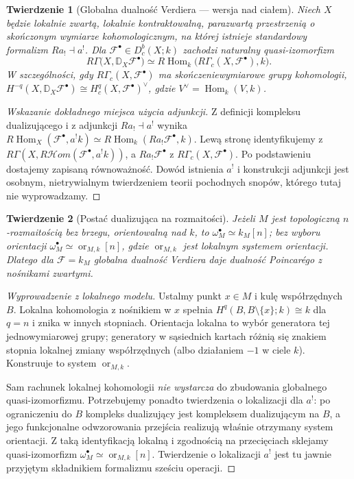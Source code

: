\documentclass[11pt,a4paper,oneside]{report}
\theoremstyle{plain}
\newtheorem{twierdzenie}{Twierdzenie}[section]
\theoremstyle{definition}
\theoremstyle{remark}
\begin{document}
\begin{twierdzenie}[Globalna dualność Verdiera — wersja nad ciałem]
\label{thm:verdier-global-v12}
Niech $X$ będzie lokalnie zwartą, lokalnie kontraktowalną,
parazwartą przestrzenią o skończonym wymiarze kohomologicznym,
na której istnieje standardowy formalizm $Ra_!\dashv a^!$.
Dla $\mathcal F^\bullet\in D^b_c(X;k)$ zachodzi
naturalny quasi-izomorfizm
\[
R\Gamma\bigl(X,\mathbb D_X\mathcal F^\bullet\bigr)
\simeq R\!\operatorname{Hom}_k
\bigl(R\Gamma_c(X,\mathcal F^\bullet),k\bigr).
\]
W szczególności, gdy $R\Gamma_c(X,\mathcal F^\bullet)$
ma skończeniewymiarowe grupy kohomologii,
$H^{-q}(X,\mathbb D_X\mathcal F^\bullet)
\cong H_c^q(X,\mathcal F^\bullet)^\vee$,
gdzie $V^\vee=\operatorname{Hom}_k(V,k)$.
\end{twierdzenie}
\begin{proof}[Wskazanie dokładnego miejsca użycia adjunkcji]
Z definicji kompleksu dualizującego i z adjunkcji
$Ra_!\dashv a^!$ wynika
$R\!\operatorname{Hom}_X(\mathcal F^\bullet,a^!k)
\simeq R\!\operatorname{Hom}_k(Ra_!\mathcal F^\bullet,k)$.
Lewą stronę identyfikujemy z
$R\Gamma(X,R\mathcal Hom(\mathcal F^\bullet,a^!k))$,
a $Ra_!\mathcal F^\bullet$ z
$R\Gamma_c(X,\mathcal F^\bullet)$.
Po podstawieniu dostajemy zapisaną równoważność.
Dowód istnienia $a^!$ i konstrukcji adjunkcji jest
osobnym, nietrywialnym twierdzeniem teorii pochodnych
snopów, którego tutaj nie wyprowadzamy.
\end{proof}

\begin{twierdzenie}[Postać dualizująca na rozmaitości]
\label{thm:verdier-manifold-v12}
Jeżeli $M$ jest topologiczną $n$-rozmaitością bez brzegu,
orientowalną nad $k$, to
$\omega_M^\bullet\simeq k_M[n]$; bez wyboru orientacji
$\omega_M^\bullet\simeq\operatorname{or}_{M,k}[n]$,
gdzie $\operatorname{or}_{M,k}$ jest lokalnym systemem orientacji.
Dlatego dla $\mathcal F=k_M$ globalna dualność Verdiera
daje dualność Poincarégo z nośnikami zwartymi.
\end{twierdzenie}
\begin{proof}[Wyprowadzenie z lokalnego modelu]
Ustalmy punkt $x\in M$ i kulę współrzędnych $B$.
Lokalna kohomologia z nośnikiem w $x$ spełnia
$H^q(B,B\setminus\{x\};k)\cong k$ dla $q=n$
i znika w innych stopniach. Orientacja lokalna to
wybór generatora tej jednowymiarowej grupy; generatory
w sąsiednich kartach różnią się znakiem stopnia
lokalnej zmiany współrzędnych (albo działaniem $-1$
w ciele $k$). Konstruuje to system $\operatorname{or}_{M,k}$.

Sam rachunek lokalnej kohomologii \emph{nie wystarcza}
do zbudowania globalnego quasi-izomorfizmu. Potrzebujemy
ponadto twierdzenia o lokalizacji dla $a^!$:
po ograniczeniu do $B$ kompleks dualizujący jest
kompleksem dualizującym na $B$, a jego funkcjonalne
odwzorowania przejścia realizują właśnie otrzymany
system orientacji. Z taką identyfikacją lokalną i
zgodnością na przecięciach sklejamy quasi-izomorfizm
$\omega_M^\bullet\simeq\operatorname{or}_{M,k}[n]$.
Twierdzenie o lokalizacji $a^!$ jest tu jawnie
przyjętym składnikiem formalizmu sześciu operacji.
\end{proof}
\end{document}
